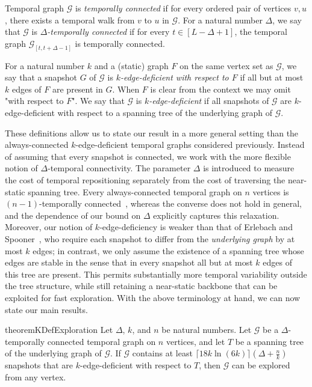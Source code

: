 \documentclass[a4paper,11pt]{article}
\theoremstyle{definition}
\theoremstyle{remark}
\newcommand{\cG}{\ensuremath{\mathcal{G}}}
\begin{document}
    Temporal graph $\cG$ is \emph{temporally connected} if for every ordered pair of
    vertices $v,u$, there exists a temporal walk from $v$ to $u$ in $\cG$.
    For a natural number $\Delta$, we say that $\cG$ is \emph{$\Delta$-temporally
    connected} if for every $t \in [L-\Delta+1]$, the temporal graph
    $\cG_{[t, t + \Delta - 1]}$ is temporally connected.

    For a natural number $k$ and a (static) graph $F$ on the same vertex set as $\cG$, we say that a snapshot $G$ of $\cG$ is \emph{$k$-edge-deficient with respect to $F$} if all but at most $k$ edges of $F$ are present in $G$. When $F$ is clear from the context we may omit "with respect to $F$". We say that $\cG$ is \emph{$k$-edge-deficient} if all snapshots of $\cG$ are $k$-edge-deficient with respect to a spanning tree of the underlying graph of $\cG$.
    
    These definitions allow us to state our result in a more general setting than the
    always-connected $k$-edge-deficient temporal graphs considered previously.
    Instead of assuming that every snapshot is connected, we work with the more
    flexible notion of $\Delta$-temporal connectivity.
    The parameter $\Delta$ is introduced to measure the cost of temporal repositioning separately from the cost of traversing the near-static spanning tree.
    Every always-connected temporal graph on $n$ vertices is
    $(n-1)$-temporally connected~\cite{MS16}, whereas the converse does not hold in
    general, and the dependence of our bound on $\Delta$ explicitly captures this
    relaxation.
    Moreover, our notion of $k$-edge-deficiency is weaker than that of Erlebach and
    Spooner~\cite{ES22}, who require each snapshot to differ from the \emph{underlying graph} by at most $k$ edges; in contrast, we only assume the existence of a spanning tree whose edges are stable in the sense that in every snapshot all but at most $k$ edges of this tree are present.
    This permits substantially more temporal variability outside the tree structure,
    while still retaining a near-static backbone that can be exploited for fast exploration.
    With the above terminology at hand, we can now state our main results.

    \begin{restatable}{theorem}{KDefExploration}
        \label{th:k-def-exploration}
        Let $\Delta$, $k$, and $n$ be natural numbers. Let $\cG$ be a $\Delta$-temporally connected temporal graph on $n$ vertices, and let $T$ be a spanning tree of the underlying graph of $\cG$. If $\cG$ contains at least $\lceil 18k \ln{(6k)} \rceil(\Delta+ \frac{n}{k})$ snapshots that are $k$-edge-deficient with respect to $T$, then $\cG$ can be explored from any vertex.
    \end{restatable}
\end{document}
